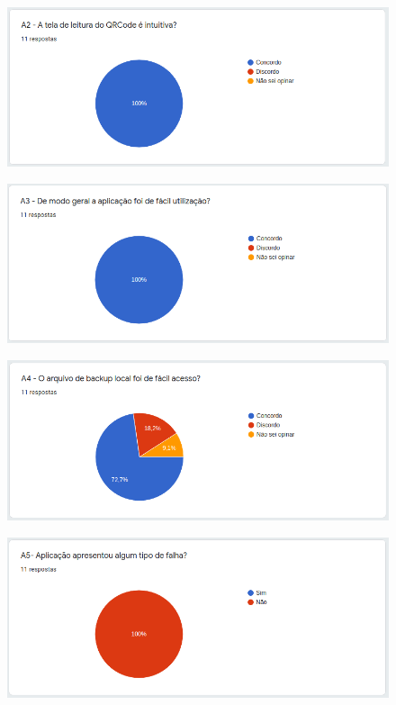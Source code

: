 \begin{figure}[H]
    \centering
    \includegraphics[scale=0.55]{figuras/form2.png}
\end{figure}

\begin{figure}[H]
    \centering
    \includegraphics[scale=0.55]{figuras/form3.png}
\end{figure}

\begin{figure}[H]
    \centering
    \includegraphics[scale=0.55]{figuras/form4.png}
\end{figure}

\begin{figure}[H]
    \centering
    \includegraphics[scale=0.55]{figuras/form5.png}
\end{figure}

